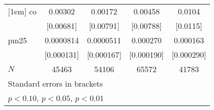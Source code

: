 \documentclass[11pt]{article}
\begin{document}
\begin{subappendices}
\begin{center}
{{\begin{tabular}{l*{4}{c}}
						[1em]
						co          &     0.00302         &     0.00172         &     0.00458         &      0.0104         \\
						&   [0.00681]         &   [0.00791]         &   [0.00788]         &    [0.0115]         \\
						[1em]
						pm25        &   0.0000814         &   0.0000511         &    0.000270         &    0.000163         \\
						&  [0.000131]         &  [0.000167]         &  [0.000190]         &  [0.000290]         \\
						\hline
						\(N\)       &       45463         &       54106         &       65572         &       41783         \\
						\hline\hline
						\multicolumn{5}{l}{\footnotesize Standard errors in brackets}\\
						\multicolumn{5}{l}{\footnotesize \sym{*} \(p<0.10\), \sym{**} \(p<0.05\), \sym{***} \(p<0.01\)}\\
					\end{tabular}
				}
				
			}
		\end{center}
		

\end{subappendices}
\end{document}

